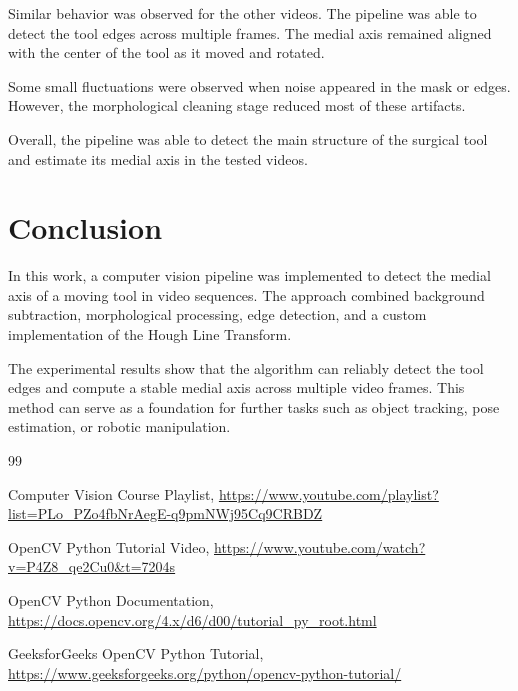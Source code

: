 \documentclass[letterpaper,10pt,conference]{ieeeconf}
\begin{document}
Similar behavior was observed for the other videos. 
The pipeline was able to detect the tool edges across multiple frames. 
The medial axis remained aligned with the center of the tool as it moved and rotated.

Some small fluctuations were observed when noise appeared in the mask or edges. 
However, the morphological cleaning stage reduced most of these artifacts.

Overall, the pipeline was able to detect the main structure of the surgical tool and estimate its medial axis in the tested videos.


\section{Conclusion}

In this work, a computer vision pipeline was implemented to detect the medial axis of a moving tool in video sequences. 
The approach combined background subtraction, morphological processing, edge detection, and a custom implementation of the 
Hough Line Transform.

The experimental results show that the algorithm can reliably detect the tool edges and compute a stable medial axis across 
multiple video frames. This method can serve as a foundation for further tasks such as object tracking, pose estimation, 
or robotic manipulation.


\begin{thebibliography}{99}

Computer Vision Course Playlist,
\url{https://www.youtube.com/playlist?list=PLo_PZo4fbNrAegE-q9pmNWj95Cq9CRBDZ}

OpenCV Python Tutorial Video,
\url{https://www.youtube.com/watch?v=P4Z8_qe2Cu0&t=7204s}

OpenCV Python Documentation,
\url{https://docs.opencv.org/4.x/d6/d00/tutorial_py_root.html}

GeeksforGeeks OpenCV Python Tutorial,
\url{https://www.geeksforgeeks.org/python/opencv-python-tutorial/}

\end{thebibliography}
\end{document}
